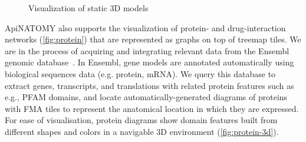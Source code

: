 \begin{figure}
\centering
  \vskip1mm
  \caption{Visualization of static 3D models}
  \label{fig:neurons}
\end{figure}

ApiNATOMY also supports the visualization of protein- and drug-interaction networks (\cref{fig:protein}) that are represented as graphs on top of treemap tiles. We are in the process of acquiring and integrating relevant data from the Ensembl genomic database~\cite{Ensemble}. In Ensembl, gene models are annotated automatically using biological sequences data (e.g. protein, mRNA). We query this database to extract genes, transcripts, and translations with related protein features such as e.g., PFAM domains, and locate automatically-generated diagrams of proteins with FMA tiles to represent the anatomical location in which they are expressed. For ease of visualisation, protein diagrams show domain features built from different shapes and colors in a navigable 3D environment (\cref{fig:protein-3d}).

